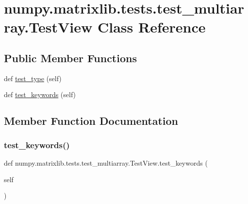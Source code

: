 \hypertarget{classnumpy_1_1matrixlib_1_1tests_1_1test__multiarray_1_1TestView}{}\section{numpy.\+matrixlib.\+tests.\+test\+\_\+multiarray.\+Test\+View Class Reference}
\label{classnumpy_1_1matrixlib_1_1tests_1_1test__multiarray_1_1TestView}
\subsection*{Public Member Functions}
\begin{DoxyCompactItemize}
\item 
def \hyperlink{classnumpy_1_1matrixlib_1_1tests_1_1test__multiarray_1_1TestView_adcab401a4622acb77e8b186115e7ebc3}{test\+\_\+type} (self)
\item 
def \hyperlink{classnumpy_1_1matrixlib_1_1tests_1_1test__multiarray_1_1TestView_a801a9e1b20e4062f3c13c695dcadfabf}{test\+\_\+keywords} (self)
\end{DoxyCompactItemize}


\subsection{Member Function Documentation}
\mbox{\label{classnumpy_1_1matrixlib_1_1tests_1_1test__multiarray_1_1TestView_a801a9e1b20e4062f3c13c695dcadfabf}} 
\subsubsection{\texorpdfstring{test\+\_\+keywords()}{test\_keywords()}}
{\footnotesize\ttfamily def numpy.\+matrixlib.\+tests.\+test\+\_\+multiarray.\+Test\+View.\+test\+\_\+keywords (\begin{DoxyParamCaption}\item[{}]{self }\end{DoxyParamCaption})}

